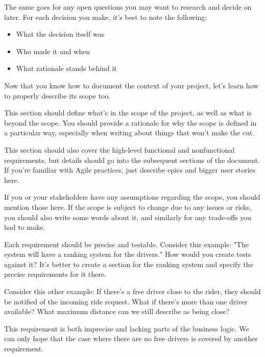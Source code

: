 The same goes for any open questions you may want to research and decide on later. For each decision you make, it's best to note the following:


\begin{itemize}
\item 
What the decision itself was

\item 
Who made it and when

\item 
What rationale stands behind it
\end{itemize}

Now that you know how to document the context of your project, let's learn how to properly describe its scope too.



This section should define what's in the scope of the project, as well as what is beyond the scope. You should provide a rationale for why the scope is defined in a particular way, especially when writing about things that won't make the cut.

This section should also cover the high-level functional and nonfunctional requirements, but details should go into the subsequent sections of the document. If you're familiar with Agile practices, just describe epics and bigger user stories here.

If you or your stakeholders have any assumptions regarding the scope, you should mention those here. If the scope is subject to change due to any issues or risks, you should also write some words about it, and similarly for any trade-offs you had to make.


Each requirement should be precise and testable. Consider this example: "The system will have a ranking system for the drivers." How would you create tests against it? It's better to create a section for the ranking system and specify the precise requirements for it there.

Consider this other example: If there's a free driver close to the rider, they should be notified of the incoming ride request. What if there's more than one driver available? What maximum distance can we still describe as being close?

This requirement is both imprecise and lacking parts of the business logic. We can only hope that the case where there are no free drivers is covered by another requirement.

